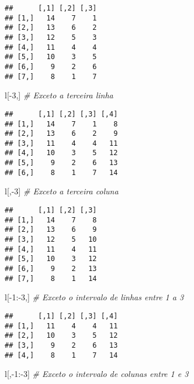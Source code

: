 \documentclass[
]{book}
\newenvironment{Shaded}{\begin{snugshade}}{\end{snugshade}}
\newcommand{\CommentTok}[1]{\textcolor[rgb]{0.56,0.35,0.01}{\textit{#1}}}
\newcommand{\DecValTok}[1]{\textcolor[rgb]{0.00,0.00,0.81}{#1}}
\newcommand{\NormalTok}[1]{#1}
\newcommand{\SpecialCharTok}[1]{\textcolor[rgb]{0.00,0.00,0.00}{#1}}
\begin{document}
\begin{verbatim}
##      [,1] [,2] [,3]
## [1,]   14    7    1
## [2,]   13    6    2
## [3,]   12    5    3
## [4,]   11    4    4
## [5,]   10    3    5
## [6,]    9    2    6
## [7,]    8    1    7
\end{verbatim}

\begin{Shaded}
\begin{Highlighting}[]
\NormalTok{l[}\SpecialCharTok{{-}}\DecValTok{3}\NormalTok{,] }\CommentTok{\# Exceto a terceira linha}
\end{Highlighting}
\end{Shaded}

\begin{verbatim}
##      [,1] [,2] [,3] [,4]
## [1,]   14    7    1    8
## [2,]   13    6    2    9
## [3,]   11    4    4   11
## [4,]   10    3    5   12
## [5,]    9    2    6   13
## [6,]    8    1    7   14
\end{verbatim}

\begin{Shaded}
\begin{Highlighting}[]
\NormalTok{l[,}\SpecialCharTok{{-}}\DecValTok{3}\NormalTok{] }\CommentTok{\# Exceto a terceira coluna}
\end{Highlighting}
\end{Shaded}

\begin{verbatim}
##      [,1] [,2] [,3]
## [1,]   14    7    8
## [2,]   13    6    9
## [3,]   12    5   10
## [4,]   11    4   11
## [5,]   10    3   12
## [6,]    9    2   13
## [7,]    8    1   14
\end{verbatim}

\begin{Shaded}
\begin{Highlighting}[]
\NormalTok{l[}\SpecialCharTok{{-}}\DecValTok{1}\SpecialCharTok{:{-}}\DecValTok{3}\NormalTok{,] }\CommentTok{\# Exceto o intervalo de linhas entre 1 a 3}
\end{Highlighting}
\end{Shaded}

\begin{verbatim}
##      [,1] [,2] [,3] [,4]
## [1,]   11    4    4   11
## [2,]   10    3    5   12
## [3,]    9    2    6   13
## [4,]    8    1    7   14
\end{verbatim}

\begin{Shaded}
\begin{Highlighting}[]
\NormalTok{l[,}\SpecialCharTok{{-}}\DecValTok{1}\SpecialCharTok{:{-}}\DecValTok{3}\NormalTok{] }\CommentTok{\# Exceto o intervalo de colunas entre 1 e 3}
\end{Highlighting}
\end{Shaded}
\end{document}
